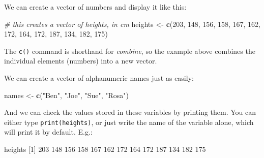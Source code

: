 \documentclass[]{article}
\newenvironment{Shaded}{\begin{snugshade}}{\end{snugshade}}
\newcommand{\CommentTok}[1]{\textcolor[rgb]{0.56,0.35,0.01}{\textit{#1}}}
\newcommand{\DecValTok}[1]{\textcolor[rgb]{0.00,0.00,0.81}{#1}}
\newcommand{\KeywordTok}[1]{\textcolor[rgb]{0.13,0.29,0.53}{\textbf{#1}}}
\newcommand{\NormalTok}[1]{#1}
\newcommand{\StringTok}[1]{\textcolor[rgb]{0.31,0.60,0.02}{#1}}
\let\oldparagraph\paragraph
\renewcommand{\paragraph}[1]{\oldparagraph{#1}\mbox{}}
\begin{document}
We can create a vector of numbers and display it like this:

\begin{Shaded}
\begin{Highlighting}[]
\CommentTok{# this creates a vector of heights, in cm}
\NormalTok{heights <-}\StringTok{ }\KeywordTok{c}\NormalTok{(}\DecValTok{203}\NormalTok{, }\DecValTok{148}\NormalTok{, }\DecValTok{156}\NormalTok{, }\DecValTok{158}\NormalTok{, }\DecValTok{167}\NormalTok{,}
             \DecValTok{162}\NormalTok{, }\DecValTok{172}\NormalTok{, }\DecValTok{164}\NormalTok{, }\DecValTok{172}\NormalTok{, }\DecValTok{187}\NormalTok{,}
             \DecValTok{134}\NormalTok{, }\DecValTok{182}\NormalTok{, }\DecValTok{175}\NormalTok{)}
\end{Highlighting}
\end{Shaded}

The \texttt{c()} command is shorthand for \emph{combine}, so the example above combines the
individual elements (numbers) into a new vector.

We can create a vector of alphanumeric names just as easily:

\begin{Shaded}
\begin{Highlighting}[]
\NormalTok{names <-}\StringTok{ }\KeywordTok{c}\NormalTok{(}\StringTok{"Ben"}\NormalTok{, }\StringTok{"Joe"}\NormalTok{, }\StringTok{"Sue"}\NormalTok{, }\StringTok{"Rosa"}\NormalTok{)}
\end{Highlighting}
\end{Shaded}

And we can check the values stored in these variables by printing them. You can
either type \texttt{print(heights)}, or just write the name of the variable alone,
which will print it by default. E.g.:

\begin{Shaded}
\begin{Highlighting}[]
\NormalTok{heights}
\NormalTok{ [}\DecValTok{1}\NormalTok{] }\DecValTok{203} \DecValTok{148} \DecValTok{156} \DecValTok{158} \DecValTok{167} \DecValTok{162} \DecValTok{172} \DecValTok{164} \DecValTok{172} \DecValTok{187} \DecValTok{134} \DecValTok{182} \DecValTok{175}
\end{Highlighting}
\end{Shaded}

\hypertarget{section-1}{%
\paragraph{}\label{section-1}}
\end{document}
